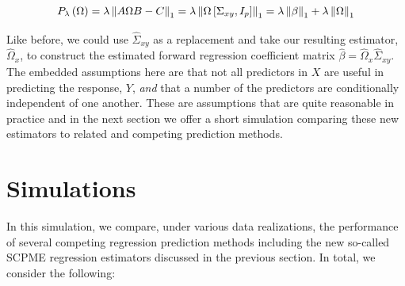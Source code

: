 \documentclass[11pt,]{report}
\theoremstyle{definition}
\theoremstyle{definition}
\theoremstyle{definition}
\theoremstyle{remark}
\begin{document}
\begin{equation}
P_{\lambda}\left(\Omega \right) = \lambda\left\| A\Omega B - C \right\|_{1} = \lambda\left\| \Omega\left[\Sigma_{xy}, I_{p}\right] \right\|_{1} = \lambda\left\| \beta \right\|_{1} + \lambda\left\| \Omega \right\|_{1}
\label{eq:pen4}\notag
\end{equation}

Like before, we could use \(\hat{\Sigma}_{xy}\) as a replacement and take our resulting estimator, \(\hat{\Omega}_{x}\), to construct the estimated forward regression coefficient matrix \(\hat{\beta} = \hat{\Omega}_{x}\hat{\Sigma}_{xy}\). The embedded assumptions here are that not all predictors in \(X\) are useful in predicting the response, \(Y\), \emph{and} that a number of the predictors are conditionally independent of one another. These are assumptions that are quite reasonable in practice and in the next section we offer a short simulation comparing these new estimators to related and competing prediction methods.

\hypertarget{simulations-1}{%
\section{Simulations}\label{simulations-1}}

In this simulation, we compare, under various data realizations, the performance of several competing regression prediction methods including the new so-called SCPME regression estimators discussed in the previous section. In total, we consider the following:
\end{document}
